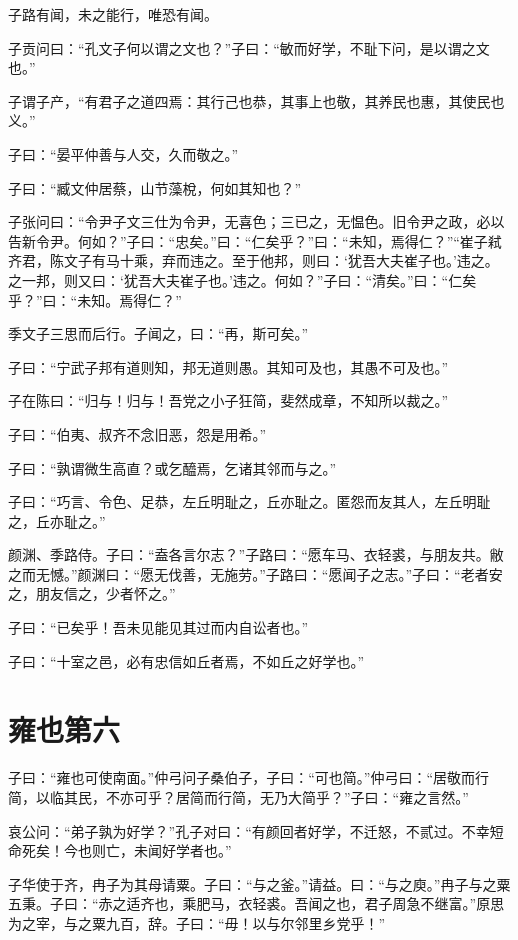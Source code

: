 \documentclass[twoside,openany]{book}
\begin{document}
子路有闻，未之能行，唯恐有闻。

子贡问曰：“孔文子何以谓之文也？”子曰：“敏而好学，不耻下问，是以谓之文也。”

子谓子产，“有君子之道四焉：其行己也恭，其事上也敬，其养民也惠，其使民也义。”

子曰：“晏平仲善与人交，久而敬之。”

子曰：“臧文仲居蔡，山节藻梲，何如其知也？”

子张问曰：“令尹子文三仕为令尹，无喜色；三已之，无愠色。旧令尹之政，必以告新令尹。何如？”子曰：“忠矣。”曰：“仁矣乎？”曰：“未知，焉得仁？”“崔子弒齐君，陈文子有马十乘，弃而违之。至于他邦，则曰：‘犹吾大夫崔子也。’违之。之一邦，则又曰：‘犹吾大夫崔子也。’违之。何如？”子曰：“清矣。”曰：“仁矣乎？”曰：“未知。焉得仁？”

季文子三思而后行。子闻之，曰：“再，斯可矣。”

子曰：“宁武子邦有道则知，邦无道则愚。其知可及也，其愚不可及也。”

子在陈曰：“归与！归与！吾党之小子狂简，斐然成章，不知所以裁之。”

子曰：“伯夷、叔齐不念旧恶，怨是用希。”

子曰：“孰谓微生高直？或乞醯焉，乞诸其邻而与之。”

子曰：“巧言、令色、足恭，左丘明耻之，丘亦耻之。匿怨而友其人，左丘明耻之，丘亦耻之。”

颜渊、季路侍。子曰：“盍各言尔志？”子路曰：“愿车马、衣轻裘，与朋友共。敝之而无憾。”颜渊曰：“愿无伐善，无施劳。”子路曰：“愿闻子之志。”子曰：“老者安之，朋友信之，少者怀之。”

子曰：“已矣乎！吾未见能见其过而内自讼者也。”

子曰：“十室之邑，必有忠信如丘者焉，不如丘之好学也。” 

\chapter{雍也第六}\label{ch6}

子曰：“雍也可使南面。”仲弓问子桑伯子，子曰：“可也简。”仲弓曰：“居敬而行简，以临其民，不亦可乎？居简而行简，无乃大简乎？”子曰：“雍之言然。”

哀公问：“弟子孰为好学？”孔子对曰：“有颜回者好学，不迁怒，不贰过。不幸短命死矣！今也则亡，未闻好学者也。”

子华使于齐，冉子为其母请粟。子曰：“与之釜。”请益。曰：“与之庾。”冉子与之粟五秉。子曰：“赤之适齐也，乘肥马，衣轻裘。吾闻之也，君子周急不继富。”原思为之宰，与之粟九百，辞。子曰：“毋！以与尔邻里乡党乎！”
\end{document}
